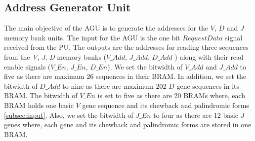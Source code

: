 %
%
\subsection{Address Generator Unit} \label{AGU}
The main objective of the AGU is to generate the addresses for the $V$, $D$ and $J$ memory bank units. The input for the AGU is the one bit $Request Data$ signal received from the PU. The outputs are the addresses for reading three sequences from the \emph{V}, \emph{J}, \emph{D} memory banks ($V\_Add$, $J\_Add$, $D\_Add$ ) along with their read enable signals ($V\_En$, $J\_En$, $D\_En$). We set the bitwidth of $V\_Add$ and $J\_Add$ to five as there are maximum $26$ sequences in their BRAM. In addition, we set the bitwidth of $D\_Add$ to nine as there are maximum $202$ $D$ gene sequences in its BRAM. The bitwidth of $V\_En$ is set to five as there are 20 BRAMs where, each BRAM holds one basic $V$ gene sequence and its chewback and palindromic forms \ref{subsec:input}. Also, we set the bitwidth of $J\_En$ to four as there are 12 basic $J$ genes where, each gene and its chewback and palindromic forms are stored in one BRAM.

